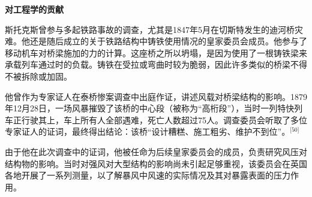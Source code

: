 \textbf{对工程学的贡献}

斯托克斯曾参与多起铁路事故的调查，尤其是1847年5月在切斯特发生的迪河桥灾难。他还是随后成立的关于铁路结构中铸铁使用情况的皇家委员会成员。他参与了移动机车对桥梁施加的力的计算。这座桥之所以坍塌，是因为使用了一根铸铁梁来承载列车通过时的负载。铸铁在受拉或弯曲时较为脆弱，因此许多类似的桥梁不得不被拆除或加固。

他曾作为专家证人在泰桥惨案调查中出庭作证，讲述风载对桥梁结构的影响。1879年12月28日，一场风暴摧毁了该桥的中心段（被称为“高桁段”），当时一列特快列车正行驶其上，车上所有人全部遇难，死亡人数超过75人。调查委员会听取了多位专家证人的证词，最终得出结论：该桥“设计糟糕、施工粗劣、维护不到位”。\(^\text{[50]}\)

由于他在此次调查中的证词，他被任命为后续皇家委员会的成员，负责研究风压对结构物的影响。当时对强风对大型结构的影响尚未引起足够重视，该委员会在英国各地开展了一系列测量，以了解暴风中风速的实际情况及其对暴露表面的压力作用。
